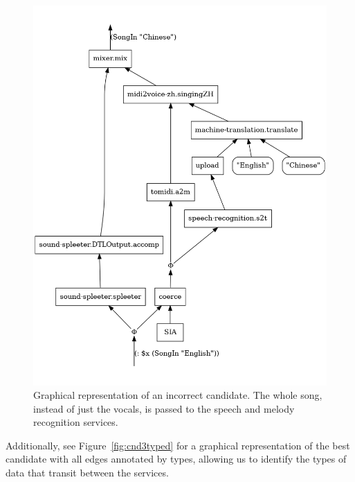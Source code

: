 \documentclass[]{report}
\begin{document}
\begin{figure}[H]
  \centering
  \includegraphics[scale=0.35]{figs/incorrect-cnd.png}
  \caption{Graphical representation of an incorrect candidate.  The
    whole song, instead of just the vocals, is passed to the speech
    and melody recognition services.}
  \label{fig:inccnd}
\end{figure}
Additionally, see Figure~\ref{fig:cnd3typed} for a graphical
representation of the best candidate with all edges annotated by
types, allowing us to identify the types of data that transit between
the services.
\end{document}
